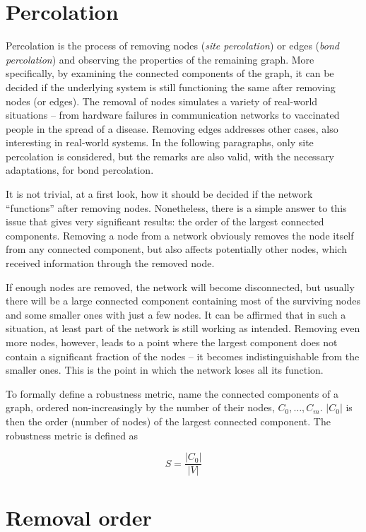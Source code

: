 \documentclass[oneside,openany]{memoir}
\begin{document}
\section{Percolation}\label{percolation}

Percolation is the process of removing nodes (\emph{site percolation})
or edges (\emph{bond percolation}) and observing the properties of the
remaining graph. More specifically, by examining the connected
components of the graph, it can be decided if the underlying system is
still functioning the same after removing nodes (or edges). The removal
of nodes simulates a variety of real-world situations -- from hardware
failures in communication networks to vaccinated people in the spread
of a disease. Removing edges addresses other cases, also interesting in
real-world systems. In the following paragraphs, only site percolation
is considered, but the remarks are also valid, with the necessary
adaptations, for bond percolation.

It is not trivial, at a first look, how it should be decided if the
network ``functions'' after removing nodes. Nonetheless, there is a
simple answer to this issue that gives very significant results: the
order of the largest connected components. Removing a node from a
network obviously removes the node itself from any connected component,
but also affects potentially other nodes, which received information
through the removed node.

If enough nodes are removed, the network will become disconnected, but
usually there will be a large connected component containing most of the
surviving nodes and some smaller ones with just a few nodes. It can be
affirmed that in such a situation, at least part of the network is still
working as intended. Removing even more nodes, however, leads to a point
where the largest component does not contain a significant fraction of
the nodes -- it becomes indistinguishable from the smaller ones. This is
the point in which the network loses all its function.

To formally define a robustness metric, name the connected components of
a graph, ordered non-increasingly by the number of their nodes,
$C_0, \ldots, C_m$. $|C_0|$ is then the order (number of nodes) of the
largest connected component. The robustness metric is defined as

\begin{equation}
S = \frac{|C_0|}{|V|}
\end{equation}

\section{Removal order}\label{removal-order}
\end{document}
